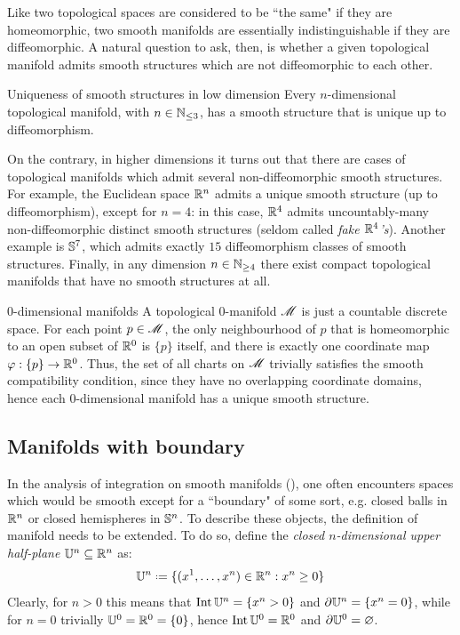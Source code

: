 Like two topological spaces are considered to be ``the same" if they are homeomorphic, two smooth manifolds are essentially indistinguishable if they are diffeomorphic. A natural question to ask, then, is whether a given topological manifold admits smooth structures which are not diffeomorphic to each other.

\begin{proposition}{Uniqueness of smooth structures in low dimension}{}
  Every $ n $-dimensional topological manifold, with $ n \in \mathbb{N}_{\leq 3} $, has a smooth structure that is unique up to diffeomorphism.
\end{proposition}

On the contrary, in higher dimensions it turns out that there are cases of topological manifolds which admit several non-diffeomorphic smooth structures. For example, the Euclidean space $ \mathbb{R}^n $ admits a unique smooth structure (up to diffeomorphism), except for $ n = 4 $: in this case, $ \mathbb{R}^4 $ admits uncountably-many non-diffeomorphic distinct smooth structures (seldom called \emph{fake $ \mathbb{R}^4 $'s}). Another example is $ \mathbb{S}^{7} $, which admits exactly $ 15 $ diffeomorphism classes of smooth structures. Finally, in any dimension $ n \in \mathbb{N}_{\geq 4} $ there exist compact topological manifolds that have no smooth structures at all.

\begin{example}{$ 0 $-dimensional manifolds}{}
  A topological $ 0 $-manifold $ \mathscr{M} $ is just a countable discrete space. For each point $ p \in \mathscr{M} $, the only neighbourhood of $ p $ that is homeomorphic to an open subset of $ \mathbb{R}^0 $ is $ \{p\} $ itself, and there is exactly one coordinate map $ \varphi : \{p\} \rightarrow \mathbb{R}^0 $. Thus, the set of all charts on $ \mathscr{M} $ trivially satisfies the smooth compatibility condition, since they have no overlapping coordinate domains, hence each $ 0 $-dimensional manifold has a unique smooth structure.
\end{example}

\subsection{Manifolds with boundary}

In the analysis of integration on smooth manifolds (), one often encounters spaces which would be smooth except for a ``boundary" of some sort, e.g. closed balls in $ \mathbb{R}^n $ or closed hemispheres in $ \mathbb{S}^{n} $. To describe these objects, the definition of manifold needs to be extended. To do so, define the \emph{closed $ n $-dimensional upper half-plane} $ \mathbb{U}^n \subseteq \mathbb{R}^n $ as:
\begin{equation}
  \U^n \defeq \{(x^1 , \dots , x^n) \in \R^n : x^n \geq 0\}
  \label{eq:upper-half-plane}
\end{equation}
Clearly, for $ n > 0 $ this means that $ \operatorname{Int} \mathbb{U}^n = \{x^n > 0\} $ and $ \partial \mathbb{U}^n = \{x^n = 0\} $, while for $ n = 0 $ trivially $ \mathbb{U}^0 = \mathbb{R}^0 = \{0\} $, hence $ \operatorname{Int} \mathbb{U}^0 = \mathbb{R}^0 $ and $ \partial \mathbb{U}^0 = \varnothing $.

